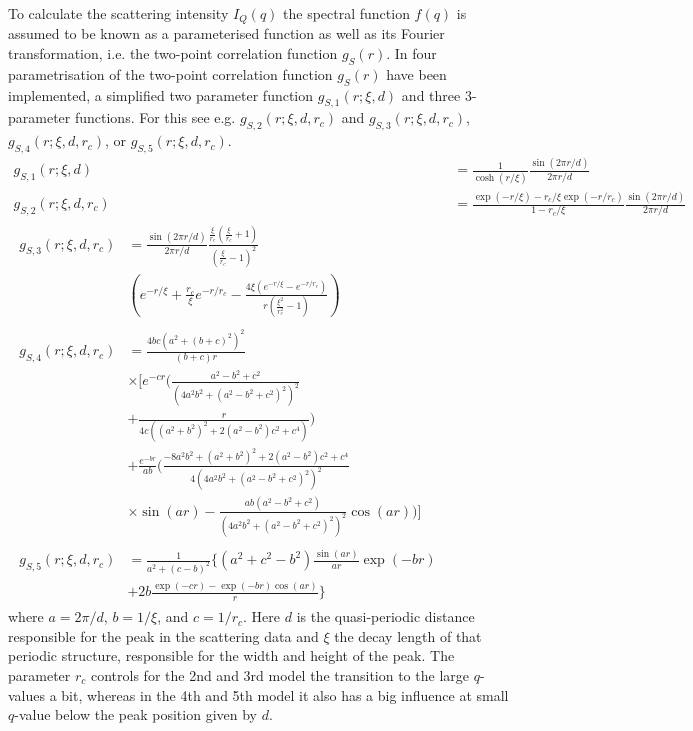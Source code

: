 To calculate the scattering intensity $I_Q(q)$ the spectral function $f(q)$ is assumed to be known as a parameterised function as well as its Fourier transformation, i.e. the two-point correlation function $g_S(r)$. In \SASfit four parametrisation of the two-point correlation function $g_S(r)$  have been implemented, a simplified two parameter function $ g_{S,1}(r;\xi,d)$ \cite{Gommes2008,Gommes2018} and three 3-parameter functions. For this see e.g. \cite{Quintanilla2003,Roberts1997} $g_{S,2}(r;\xi,d,r_c)$ and \cite{Pieruschka1992} $g_{S,3}(r;\xi,d,r_c)$, \cite{Jinnai2000} $ g_{S,4}(r;\xi,d,r_c)$, or \cite{Chen1998}  $g_{S,5}(r;\xi,d,r_c)$.
\begin{align}
  g_{S,1}(r;\xi,d)    &= \frac{1}{\cosh(r/\xi)}\frac{\sin (2\pi r/d)}{2\pi r/d}\\
  g_{S,2}(r;\xi,d,r_c) &= \frac{\exp(-r/\xi)-r_c/\xi \exp(-r/r_c)}{1-r_c/\xi} \frac{\sin (2\pi r/d)}{2\pi r/d}\\
\begin{split}
 g_{S,3}(r;\xi,d,r_c) &= \frac{\sin (2\pi r/d)}{2\pi r/d} \frac{\frac{\xi}{r_c}\left(\frac{\xi}{r_c}+1\right)}{\left(\frac{\xi}{r_c}-1\right)^2}  \\
     & \left(e^{-r/\xi}+\frac{r_c}{\xi}e^{-r/r_c} - \frac{4\xi\left(e^{-r/\xi}-e^{-r/r_c}\right)}{r\left(\frac{\xi^2}{r_c^2}-1\right)}\right)
\end{split} \\
\begin{split}
  g_{S,4}(r;\xi,d,r_c) &= \frac{4bc\left(a^2+\left(b+c\right)^2\right)^2}{(b+c)r}  \\
                      & \times \Bigg[ e^{-cr}\Bigg(\frac{a^2-b^2+c^2}{\left(4a^2b^2+\left(a^2-b^2+c^2\right)^2\right)^2} \\
                      & + \frac{r}{4c\left(\left(a^2+b^2\right)^2+2\left(a^2-b^2\right)c^2+c^4\right)}\Bigg) \\
                      & +\frac{e^{-br}}{ab} \Bigg( \frac{-8a^2b^2+\left(a^2+b^2\right)^2+2\left(a^2-b^2\right)c^2+c^4}{4\left(4a^2b^2+\left(a^2-b^2+c^2\right)^2\right)^2}\\
                      & \times \sin(ar) - \frac{ab\left(a^2-b^2+c^2\right)}{\left(4a^2b^2+\left(a^2-b^2+c^2\right)^2\right)^2}\cos(ar)\Bigg) \Bigg]
\end{split} \\
\begin{split}
  g_{S,5}(r;\xi,d,r_c) &= \frac{1}{a^2+(c-b)^2} \Biggl\{ (a^2+c^2-b^2)\frac{\sin (ar)}{ar} \exp(-br)  \\
                      & +  2b \frac{\exp(-cr)-\exp(-br)\cos(ar)}{r}\Biggr\}
\end{split}
\end{align}
where $a=2\pi/d$, $b=1/\xi$, and $c=1/r_c$. Here $d$ is the quasi-periodic distance responsible for the peak in the scattering data and $\xi$ the decay length of that periodic structure, responsible for the width and height of the peak. The parameter $r_c$ controls for the 2nd and 3rd model the transition to the large $q$-values a bit, whereas in the 4th and 5th model it also has a big influence at small $q$-value below the peak position given by $d$.

